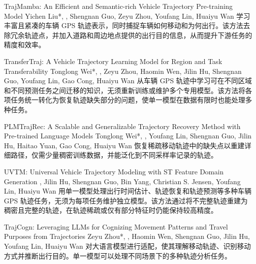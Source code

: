 {TrajMamba: An Efficient and Semantic-rich Vehicle Trajectory Pre-training Model}
{Yichen Liu*, \me*, Shengnan Guo, Zeyu Zhou, Youfang Lin, Huaiyu Wan}
{学习丰富且紧凑的车辆 GPS 轨迹表示，同时捕捉车辆如何移动和为何出行。该方法去除冗余轨迹点，并加入道路和周边地点提供的出行目的信息，从而提升下游任务的精度和效率。}

{TransferTraj: A Vehicle Trajectory Learning Model for Region and Task Transferability}
{Tonglong Wei*, \me*, Zeyu Zhou, Haomin Wen, Jilin Hu, Shengnan Guo, Youfang Lin, Gao Cong, Huaiyu Wan}
{从车辆 GPS 轨迹中学习可在不同区域和不同预测任务之间迁移的知识，无须重新训练或维护多个专用模型。该方法将各项任务统一转化为恢复轨迹缺失部分的问题，使单一模型在数据有限时也能处理多种任务。}

{PLMTrajRec: A Scalable and Generalizable Trajectory Recovery Method with Pre-trained Language Models}
{Tonglong Wei*, \me*, Youfang Lin, Shengnan Guo, Jilin Hu, Haitao Yuan, Gao Cong, Huaiyu Wan}
{恢复稀疏移动轨迹中的缺失点以重建详细路径，仅需少量稠密训练数据，并能泛化到不同采样率记录的轨迹。}

{UVTM: Universal Vehicle Trajectory Modeling with ST Feature Domain Generation}
{\me, Jilin Hu, Shengnan Guo, Bin Yang, Christian S. Jensen, Youfang Lin, Huaiyu Wan}
{用单一模型处理出行时间估计、轨迹恢复和轨迹预测等多种车辆 GPS 轨迹任务，无须为每项任务维护独立模型。该方法通过将不完整轨迹重建为稠密且完整的轨迹，在轨迹稀疏或仅有部分特征时仍能保持较高精度。}

{TrajCogn: Leveraging LLMs for Cognizing Movement Patterns and Travel Purposes from Trajectories}
{Zeyu Zhou*, \me*, Haomin Wen, Shengnan Guo, Jilin Hu, Youfang Lin, Huaiyu Wan}
{对大语言模型进行适配，使其理解移动轨迹、识别移动方式并推断出行目的。单一模型可以处理不同场景下的多种轨迹分析任务。}

